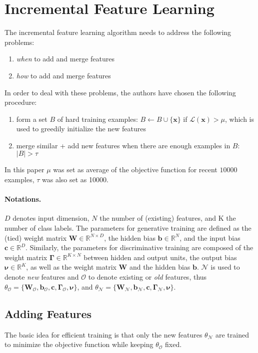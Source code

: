 \documentclass[a4paper,twocolumn]{article}
\newcommand{\N}{\mathcal{N}}
\renewcommand{\L}{\mathcal{L}}
\renewcommand{\O}{\mathcal{O}}
\let\originalnu\nu
\renewcommand{\nu}{\boldsymbol{\originalnu}}
\begin{document}
\section{Incremental Feature Learning}
The incremental feature learning algorithm needs to address the following problems:
\begin{enumerate}
    \item \textit{when} to add and merge features
    \item \textit{how} to add and merge features
\end{enumerate}
In order to deal with these problems, the authors have chosen the following procedure:
\begin{enumerate}
    \item form a set $B$ of hard training examples: $B \leftarrow B \cup \{\textbf{x}\}$ if $\L(\textbf{x}) > \mu$, which is used to greedily initialize the new features
    \item merge similar + add new features when there are enough examples in $B$: $|B| > \tau$
\end{enumerate}
In this paper $\mu$ was set as average of the objective function for recent $10000$ examples, $\tau$ was also set as 10000.

\paragraph{Notations.} $D$ denotes input dimension, $N$ the number of (existing) features, and K the number of class labels. The parameters for generative training are defined as the (tied) weight matrix $\mathbf{W} \in \mathbb{R}^{N \times D}$, the hidden bias $\mathbf{b} \in \mathbb{R}^N$, and the input bias $\mathbf{c} \in \mathbb{R}^D$. Similarly, the parameters for discriminative training are composed of the weight matrix $\mathbf{\Gamma} \in \mathbb{R}^{K \times N}$ between hidden and output units, the output bias $\nu \in \mathbb{R}^K$, as well as the weight matrix $\mathbf{W}$ and the hidden bias $\mathbf{b}$. $\N$ is used to denote \textit{new} features and $\O$ to denote existing or \textit{old} features, thus $\theta_\O = \{\mathbf{W_\O, b_\O, c, \Gamma_\O, \nu}\}$, and $\theta_\N = \{\mathbf{W_\N, b_\N, c, \Gamma_\N, \nu}\}$.


\subsection{Adding Features}
The basic idea for efficient training is that only the new features $\theta_\N$ are trained to minimize the objective function while keeping $\theta_\O$ fixed.
\end{document}
